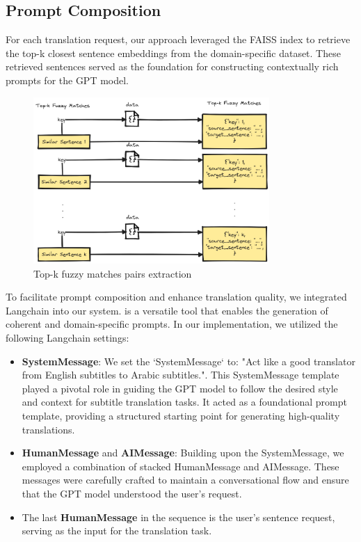 \documentclass[12pt]{article}
\begin{document}
\newpage



\subsection{Prompt Composition}

For each translation request, our approach leveraged the FAISS index to retrieve the top-k closest sentence embeddings from the domain-specific dataset. These retrieved sentences served as the foundation for constructing contextually rich prompts for the GPT model.

	
\begin{figure}[h]
	\centering
	\includegraphics[width=0.8\textwidth]{assets/construct_fuzzy_matches_pairs.png}
	\caption{Top-k fuzzy matches pairs extraction}
	\label{fig:fuzzymatches}
\end{figure}


To facilitate prompt composition and enhance translation quality, we integrated Langchain into our system. \cite{langchain} is a versatile tool that enables the generation of coherent and domain-specific prompts. In our implementation, we utilized the following Langchain settings:



\begin{itemize}
	\item \textbf{SystemMessage}: We set the `SystemMessage` to:  "Act like a good translator from English subtitles to Arabic subtitles.". This SystemMessage template played a pivotal role in guiding the GPT model to follow the desired style and context for subtitle translation tasks. It acted as a foundational prompt template, providing a structured starting point for generating high-quality translations.
	
	\item \textbf{HumanMessage} and \textbf{AIMessage}: Building upon the SystemMessage, we employed a combination of stacked HumanMessage and AIMessage. These messages were carefully crafted to maintain a conversational flow and ensure that the GPT model understood the user's request.
	
	\item The last \textbf{HumanMessage} in the sequence is the user's sentence request, serving as the input for the translation task.

	
\end{itemize}
\end{document}
